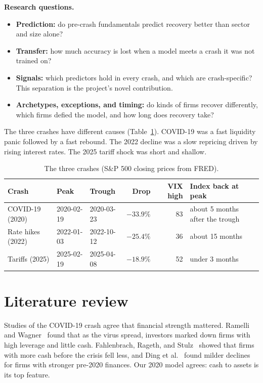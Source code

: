 \documentclass[11pt]{article}
\begin{document}
\textbf{Research questions.}
\begin{itemize}
  \item \textbf{Prediction:} do pre-crash fundamentals predict recovery better than sector and size alone?
  \item \textbf{Transfer:} how much accuracy is lost when a model meets a crash it was not trained on?
  \item \textbf{Signals:} which predictors hold in every crash, and which are crash-specific? This separation is the project's novel contribution.
  \item \textbf{Archetypes, exceptions, and timing:} do kinds of firms recover differently, which firms defied the model, and how long does recovery take?
\end{itemize}

The three crashes have different causes (Table~\ref{tab:crashes}). COVID-19 was a fast liquidity panic followed by a fast rebound. The 2022 decline was a slow repricing driven by rising interest rates. The 2025 tariff shock was short and shallow.

\begin{table}[h]
\centering\small
\caption{The three crashes (S\&P 500 closing prices from FRED).}
\label{tab:crashes}
\begin{tabular}{lllrrl}
\toprule
Crash & Peak & Trough & Drop & VIX high & Index back at peak \\
\midrule
COVID-19 (2020) & 2020-02-19 & 2020-03-23 & $-33.9\%$ & 83 & about 5 months after the trough \\
Rate hikes (2022) & 2022-01-03 & 2022-10-12 & $-25.4\%$ & 36 & about 15 months \\
Tariffs (2025) & 2025-02-19 & 2025-04-08 & $-18.9\%$ & 52 & under 3 months \\
\bottomrule
\end{tabular}
\end{table}

\section{Literature review}

Studies of the COVID-19 crash agree that financial strength mattered. Ramelli and Wagner~\cite{ramelli2020} found that as the virus spread, investors marked down firms with high leverage and little cash. Fahlenbrach, Rageth, and Stulz~\cite{fahlenbrach2021} showed that firms with more cash before the crisis fell less, and Ding et al.~\cite{ding2021} found milder declines for firms with stronger pre-2020 finances. Our 2020 model agrees: cash to assets is its top feature.
\end{document}
